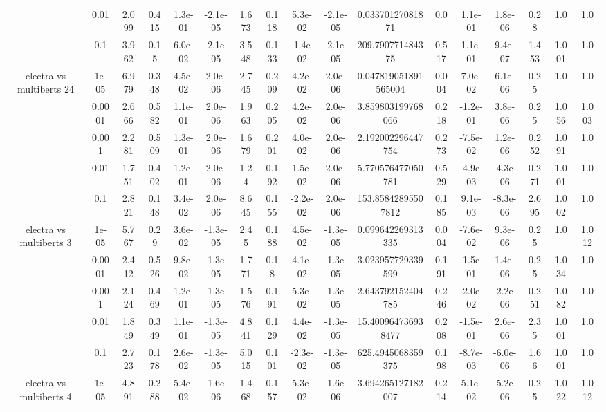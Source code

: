 \begin{tabular}{|c|c|c|c|c|c|c|c|c|c|c|c|c|c|c|c|c|}
 & 0.01 & 2.099 & 0.415 & 1.3e-01 & -2.1e-05 & 1.673 & 0.118 & 5.3e-02 & -2.1e-05 & 0.03370127081871 & 0.0 & 1.1e-01 & 1.8e-06 & 0.28 & 1.0 & 1.0 \\
 & 0.1 & 3.962 & 0.15 & 6.0e-02 & -2.1e-05 & 3.548 & 0.133 & -1.4e-02 & -2.1e-05 & 209.790771484375 & 0.517 & 1.1e-01 & 9.4e-07 & 1.453 & 1.001 & 1.0 \\
\hline
\multirow{5}{*}{electra  vs multiberts 24} & 1e-05 & 6.979 & 0.348 & 4.5e-02 & 2.0e-06 & 2.745 & 0.209 & 4.2e-02 & 2.0e-06 & 0.047819051891565004 & 0.004 & 7.0e-02 & 6.1e-06 & 0.25 & 1.0 & 1.0 \\
 & 0.0001 & 2.666 & 0.582 & 1.1e-01 & 2.0e-06 & 1.963 & 0.205 & 4.2e-02 & 2.0e-06 & 3.859803199768066 & 0.218 & -1.2e-01 & 3.8e-06 & 0.25 & 1.056 & 1.003 \\
 & 0.001 & 2.281 & 0.509 & 1.3e-01 & 2.0e-06 & 1.679 & 0.201 & 4.0e-02 & 2.0e-06 & 2.192002296447754 & 0.273 & -7.5e-02 & 1.2e-06 & 0.252 & 1.091 & 1.0 \\
 & 0.01 & 1.751 & 0.402 & 1.2e-01 & 2.0e-06 & 1.24 & 0.192 & 1.5e-02 & 2.0e-06 & 5.770576477050781 & 0.529 & -4.9e-03 & -4.3e-06 & 0.271 & 1.001 & 1.0 \\
 & 0.1 & 2.821 & 0.148 & 3.4e-02 & 2.0e-06 & 8.645 & 0.155 & -2.2e-02 & 2.0e-06 & 153.85842895507812 & 0.185 & 9.1e-03 & -8.3e-06 & 2.695 & 1.002 & 1.0 \\
\hline
\multirow{5}{*}{electra  vs multiberts 3} & 1e-05 & 5.767 & 0.29 & 3.6e-02 & -1.3e-05 & 2.45 & 0.188 & 4.5e-02 & -1.3e-05 & 0.099642269313335 & 0.004 & -7.6e-02 & 9.3e-06 & 0.25 & 1.0 & 1.012 \\
 & 0.0001 & 2.412 & 0.526 & 9.8e-02 & -1.3e-05 & 1.771 & 0.18 & 4.1e-02 & -1.3e-05 & 3.023957729339599 & 0.191 & -1.5e-01 & 1.4e-06 & 0.25 & 1.034 & 1.0 \\
 & 0.001 & 2.124 & 0.469 & 1.2e-01 & -1.3e-05 & 1.576 & 0.191 & 5.3e-02 & -1.3e-05 & 2.643792152404785 & 0.246 & -2.0e-02 & -2.2e-06 & 0.251 & 1.082 & 1.0 \\
 & 0.01 & 1.849 & 0.349 & 1.1e-01 & -1.3e-05 & 4.841 & 0.129 & 4.4e-02 & -1.3e-05 & 15.400964736938477 & 0.208 & -1.5e-01 & 2.6e-06 & 2.35 & 1.001 & 1.0 \\
 & 0.1 & 2.723 & 0.178 & 2.6e-02 & -1.3e-05 & 5.015 & 0.101 & -2.3e-02 & -1.3e-05 & 625.4945068359375 & 0.198 & -8.7e-03 & -6.0e-06 & 1.66 & 1.001 & 1.0 \\
\hline
\multirow{5}{*}{electra  vs multiberts 4} & 1e-05 & 4.891 & 0.288 & 5.4e-02 & -1.6e-06 & 1.468 & 0.157 & 5.3e-02 & -1.6e-06 & 3.694265127182007 & 0.214 & 5.1e-02 & -5.2e-06 & 0.25 & 1.022 & 1.012 \\

\end{tabular}
